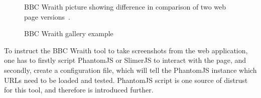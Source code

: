 \documentclass[11pt,oneside,final]{fithesis2}
\begin{document}
  \begin{figure}[!htb]
    \begin{center}
    \leavevmode
    \centerline{}
    \end{center}
    \caption{BBC Wraith picture showing difference in comparison of two web page versions~\citep{bbc_wraith_diff}.}
    \label{fig:bbcWraithDiff} 
  \end{figure}

  
  \begin{figure}[!htb]
    \begin{center}
    \leavevmode
    \centerline{}
    \end{center}
    \caption{BBC Wraith gallery example~\citep{bbc_wraith_gallery_example}}
    \label{fig:bbcGallery} 
  \end{figure}
  
  To instruct the BBC Wraith tool to take screenshots from the web application, one has to firstly script PhantomJS or SlimerJS to interact with the page, and secondly, create a 
  configuration file, which will tell the PhantomJS instance which URLs need to be loaded and tested. PhantomJS script is one source of distrust for this tool, and therefore is
  introduced further.
  
\end{document}
